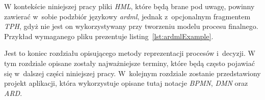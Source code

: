 W kontekście niniejszej pracy pliki \emph{HML}, które będą brane pod uwagę, powinny zawierać w~sobie podzbiór językowy \emph{ardml}, jednak z~opcjonalnym fragmentem \emph{TPH}, gdyż nie jest on wykorzystywany przy tworzeniu modelu procesu finalnego. Przykład wymaganego pliku prezentuje listing~\ref{lst:ardmlExample}.

\vspace{1cm}

Jest to koniec rozdziału opisującego metody reprezentacji procesów i~decyzji. W tym rozdziale opisane zostały najważniejsze terminy, które będą często pojawiać się w~dalszej części niniejszej pracy. W~kolejnym rozdziale zostanie przedstawiony projekt aplikacji, która wykorzystuje opisane tutaj notacje \emph{BPMN}, \emph{DMN} oraz \emph{ARD}.

